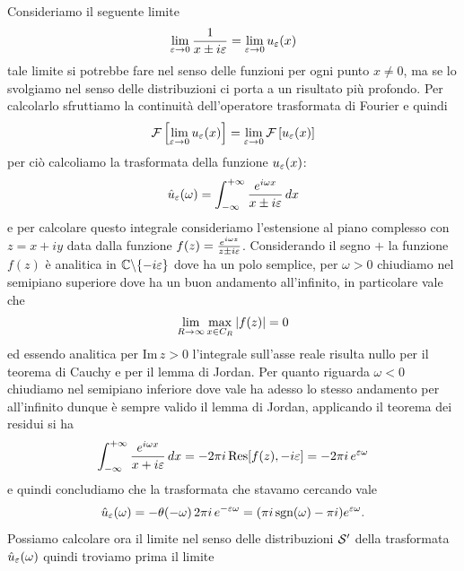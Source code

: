 \begin{example}
  Consideriamo il seguente limite 
  \begin{align}
    \lim_{\eps\to0} \frac1{x \pm i\eps} = \lim_{\eps \to 0} u_\eps(x)
  \end{align}
  tale limite si potrebbe fare nel senso delle funzioni per ogni punto $ x \neq 0 $, ma se lo svolgiamo nel senso delle distribuzioni ci porta a un
  risultato più profondo. Per calcolarlo sfruttiamo la continuità dell'operatore trasformata di Fourier e quindi 
  \begin{align}
    \F\left[ \lim_{\eps \to 0} u_\eps(x) \right] = \lim_{\eps \to 0} \F\left[ u_\eps(x) \right]
  \end{align}
  per ciò calcoliamo la trasformata della funzione $ u_\eps(x) $:
  \begin{align}
    \hat{u}_\eps(\omega) = \int_{-\infty}^{+\infty} \frac{e^{i\omega x}}{x \pm i\eps} \, dx
  \end{align}
  e per calcolare questo integrale consideriamo l'estensione al piano complesso con $ z = x + iy $ data dalla funzione 
  $ f(z) = \frac{e^{i\omega z}}{z\pm i\eps} $. Considerando il segno $ + $ la funzione $ f(z) $ è analitica in $ \C \bs \{-i\eps\} $ dove ha un polo 
  semplice, per $ \omega > 0 $ chiudiamo nel semipiano superiore dove ha un buon andamento all'infinito, in particolare vale che 
  \begin{align}
    \lim_{R\to \infty} \max_{x \in C_R} \abs{f(z)} = 0
  \end{align}
  ed essendo analitica per $ \text{Im} \,z> 0 $ l'integrale sull'asse reale risulta nullo per il teorema di Cauchy e per il lemma di Jordan. Per quanto 
  riguarda $ \omega < 0 $ chiudiamo nel semipiano inferiore dove vale ha adesso lo stesso andamento per all'infinito dunque è sempre valido il lemma di 
  Jordan, applicando il teorema dei residui si ha 
  \begin{align}
    \int_{-\infty}^{+\infty} \frac{e^{i\omega x}}{x + i\eps} \, dx = -2\pi i \Res[ f(z), -i\eps ] = -2\pi i \,e^{\eps \omega}
  \end{align}
  e quindi concludiamo che la trasformata che stavamo cercando vale 
  \begin{align}
    \hat{u}_\eps(\omega) = -\theta(-\omega) \,2\pi i\,e^{-\eps \omega} = (\pi i \sgn(\omega) -\pi i) e^{\eps \omega}.
  \end{align}
  Possiamo calcolare ora il limite nel senso delle distribuzioni $ \S' $ della trasformata $ \hat{u}_\eps(\omega) $ quindi troviamo prima il limite 

\end{example}
